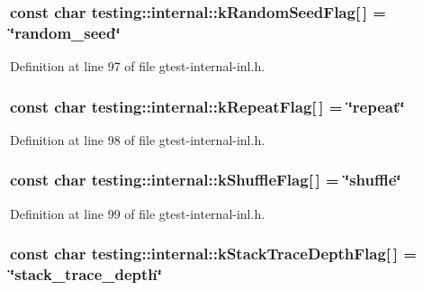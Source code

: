 \subsubsection[{\texorpdfstring{k\+Random\+Seed\+Flag}{kRandomSeedFlag}}]{\setlength{\rightskip}{0pt plus 5cm}const char testing\+::internal\+::k\+Random\+Seed\+Flag\mbox{[}$\,$\mbox{]} = \char`\"{}random\+\_\+seed\char`\"{}}\hypertarget{namespacetesting_1_1internal_a964ad71443cfda304b3208bf5d2daa75}{}\label{namespacetesting_1_1internal_a964ad71443cfda304b3208bf5d2daa75}


Definition at line 97 of file gtest-\/internal-\/inl.\+h.

\subsubsection[{\texorpdfstring{k\+Repeat\+Flag}{kRepeatFlag}}]{\setlength{\rightskip}{0pt plus 5cm}const char testing\+::internal\+::k\+Repeat\+Flag\mbox{[}$\,$\mbox{]} = \char`\"{}repeat\char`\"{}}\hypertarget{namespacetesting_1_1internal_a764ee423d39ebb8e10c53ab9b685cd9b}{}\label{namespacetesting_1_1internal_a764ee423d39ebb8e10c53ab9b685cd9b}


Definition at line 98 of file gtest-\/internal-\/inl.\+h.

\subsubsection[{\texorpdfstring{k\+Shuffle\+Flag}{kShuffleFlag}}]{\setlength{\rightskip}{0pt plus 5cm}const char testing\+::internal\+::k\+Shuffle\+Flag\mbox{[}$\,$\mbox{]} = \char`\"{}shuffle\char`\"{}}\hypertarget{namespacetesting_1_1internal_affd2c1118505cb97d8ff728c95fc722b}{}\label{namespacetesting_1_1internal_affd2c1118505cb97d8ff728c95fc722b}


Definition at line 99 of file gtest-\/internal-\/inl.\+h.

\subsubsection[{\texorpdfstring{k\+Stack\+Trace\+Depth\+Flag}{kStackTraceDepthFlag}}]{\setlength{\rightskip}{0pt plus 5cm}const char testing\+::internal\+::k\+Stack\+Trace\+Depth\+Flag\mbox{[}$\,$\mbox{]} = \char`\"{}stack\+\_\+trace\+\_\+depth\char`\"{}}\hypertarget{namespacetesting_1_1internal_ad6f90e66d431ca3a9084408878c2cc77}{}\label{namespacetesting_1_1internal_ad6f90e66d431ca3a9084408878c2cc77}


